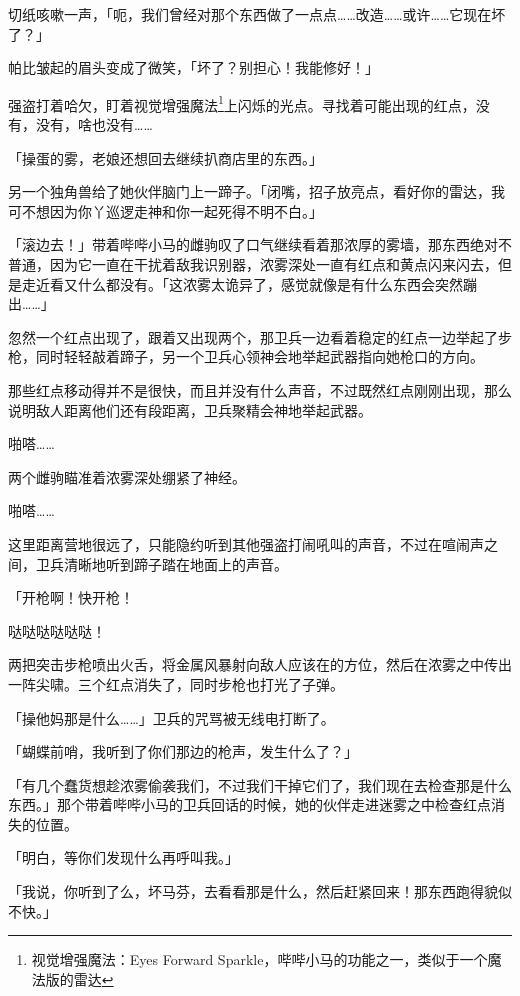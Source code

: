 切纸咳嗽一声，「呃，我们曾经对那个东西做了一点点……改造……或许……它现在坏了？」

帕比皱起的眉头变成了微笑，「坏了？别担心！我能修好！」

\horizonline


强盗打着哈欠，盯着视觉增强魔法\footnote{视觉增强魔法：Eyes Forward Sparkle，哔哔小马的功能之一，类似于一个魔法版的雷达}上闪烁的光点。寻找着可能出现的红点，没有，没有，啥也没有……{}

「操蛋的雾，老娘还想回去继续扒商店里的东西。」

另一个独角兽给了她伙伴脑门上一蹄子。「闭嘴，招子放亮点，看好你的雷达，我可不想因为你丫巡逻走神和你一起死得不明不白。」

「滚边去！」带着哔哔小马的雌驹叹了口气继续看着那浓厚的雾墙，那东西绝对不普通，因为它一直在干扰着敌我识别器，浓雾深处一直有红点和黄点闪来闪去，但是走近看又什么都没有。「这浓雾太诡异了，感觉就像是有什么东西会突然蹦出……」

忽然一个红点出现了，跟着又出现两个，那卫兵一边看着稳定的红点一边举起了步枪，同时轻轻敲着蹄子，另一个卫兵心领神会地举起武器指向她枪口的方向。

那些红点移动得并不是很快，而且并没有什么声音，不过既然红点刚刚出现，那么说明敌人距离他们还有段距离，卫兵聚精会神地举起武器。

啪嗒……{}

两个雌驹瞄准着浓雾深处绷紧了神经。

啪嗒……{}

这里距离营地很远了，只能隐约听到其他强盗打闹吼叫的声音，不过在喧闹声之间，卫兵清晰地听到蹄子踏在地面上的声音。

「开枪啊！快开枪！

哒哒哒哒哒哒！

两把突击步枪喷出火舌，将金属风暴射向敌人应该在的方位，然后在浓雾之中传出一阵尖啸。三个红点消失了，同时步枪也打光了子弹。

「操他妈那是什么……」卫兵的咒骂被无线电打断了。

「蝴蝶前哨，我听到了你们那边的枪声，发生什么了？」

「有几个蠢货想趁浓雾偷袭我们，不过我们干掉它们了，我们现在去检查那是什么东西。」那个带着哔哔小马的卫兵回话的时候，她的伙伴走进迷雾之中检查红点消失的位置。

「明白，等你们发现什么再呼叫我。」

「我说，你听到了么，坏马芬，去看看那是什么，然后赶紧回来！那东西跑得貌似不快。」

